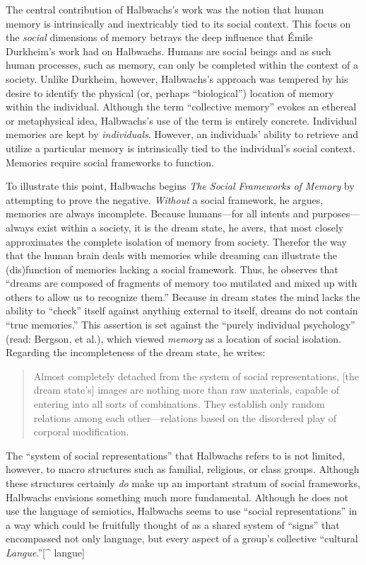 The central contribution of Halbwachs's work was the notion that human
memory is intrinsically and inextricably tied to its social context.
This focus on the \emph{social} dimensions of memory betrays the deep
influence that Émile Durkheim's work had on Halbwachs. Humans are social
beings and as such human processes, such as memory, can only be
completed within the context of a society. Unlike Durkheim, however,
Halbwachs's approach was tempered by his desire to identify the physical
(or, perhaps ``biological'') location of memory within the individual.
Although the term ``collective memory'' evokes an ethereal or
metaphysical idea, Halbwachs's use of the term is entirely concrete.
Individual memories are kept by \emph{individuals}. However, an
individuals' ability to retrieve and utilize a particular memory is
intrinsically tied to the individual's social context. Memories require
social frameworks to function.\autocite[38]{halbwachs1992}

To illustrate this point, Halbwachs begins \emph{The Social Frameworks
of Memory} by attempting to prove the negative. \emph{Without} a social
framework, he argues, memories are always incomplete. Because
humans---for all intents and purposes---always exist within a society,
it is the dream state, he avers, that most closely approximates the
complete isolation of memory from society. Therefor the way that the
human brain deals with memories while dreaming can illustrate the
(dis)function of memories lacking a social framework. Thus, he observes
that ``dreams are composed of fragments of memory too mutilated and
mixed up with others to allow us to recognize them.'' Because in dream
states the mind lacks the ability to ``check'' itself against anything
external to itself, dreams do not contain ``true
memories.''\autocite[41]{halbwachs1992} This assertion is set against
the ``purely individual psychology'' (read: Bergson, et al.), which
viewed \emph{memory} as a location of social isolation. Regarding the
incompleteness of the dream state, he writes:

\begin{quote}
Almost completely detached from the system of social representations,
{[}the dream state's{]} images are nothing more than raw materials,
capable of entering into all sorts of combinations. They establish only
random relations among each other---relations based on the disordered
play of corporal modification.\autocite[42]{halbwachs1992}
\end{quote}

The ``system of social representations'' that Halbwachs refers to is not
limited, however, to macro structures such as familial, religious, or
class groups. Although these structures certainly \emph{do} make up an
important stratum of social frameworks, Halbwachs envisions something
much more fundamental. Although he does not use the language of
semiotics, Halbwachs seems to use ``social representations'' in a way
which could be fruitfully thought of as a shared system of ``signs''
that encompassed not only language, but every aspect of a group's
collective ``cultural \emph{Langue}.''{[}\^{} langue{]}

